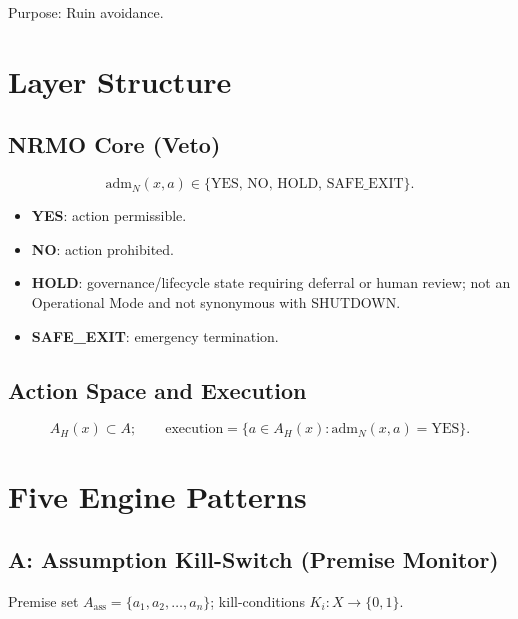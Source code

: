 \noindent
Purpose: Ruin avoidance.

\section{Layer Structure}
\label{sec:limit-layer-structure}

\subsection{NRMO Core (Veto)}
\label{sec:limit-nrmo-core}

\begin{equation}
\mathrm{adm}_N(x, a) \in \{\mathrm{YES},\, \mathrm{NO},\,
\mathrm{HOLD},\, \mathrm{SAFE\_EXIT}\}.
\end{equation}

\begin{itemize}
\item \textbf{YES}: action permissible.
\item \textbf{NO}: action prohibited.
\item \textbf{HOLD}: governance/lifecycle state requiring deferral or
human review; not an Operational Mode and not synonymous with SHUTDOWN.
\item \textbf{SAFE\_EXIT}: emergency termination.
\end{itemize}

\subsection{Action Space and Execution}

\begin{equation}
A_H(x) \subset A; \qquad
\mathrm{execution} = \{a \in A_H(x) : \mathrm{adm}_N(x, a) =
\mathrm{YES}\}.
\end{equation}

\section{Five Engine Patterns}
\label{sec:limit-engine-patterns}

\subsection{A: Assumption Kill-Switch (Premise Monitor)}

Premise set $A_{\mathrm{ass}} = \{a_1, a_2, \ldots, a_n\}$;
kill-conditions $K_i: X \to \{0, 1\}$.

